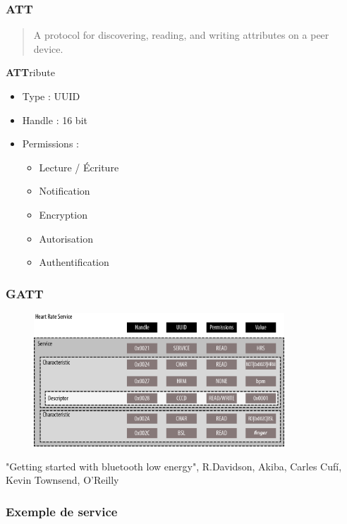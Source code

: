\begin{frame}
	\frametitle{ATT}
	\begin{quote}A protocol for discovering, reading, and writing attributes on a peer device.\end{quote}

	\begin{block}{\textbf{ATT}ribute}
		\begin{itemize}
			\item Type : UUID
			\item Handle : 16 bit
			\item Permissions :
				\begin{itemize}
					\item Lecture / Écriture
					\item Notification
					\item Encryption
					\item Autorisation
					\item Authentification
				\end{itemize}
		\end{itemize}
	\end{block}
\end{frame}

\begin{frame}
	\frametitle{GATT}
	\begin{figure}
		\includegraphics[height=5cm]{img/gatt.png}
	\end{figure}
{\tiny "Getting started with bluetooth low energy", R.Davidson, Akiba, Carles Cufí, Kevin Townsend, O'Reilly}

\end{frame}

\begin{frame}
	\frametitle{Exemple de service}
\end{frame}
